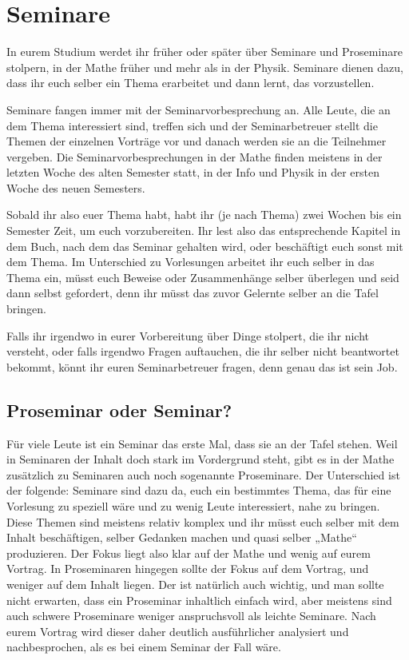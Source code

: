 \section{Seminare}

In eurem Studium werdet ihr früher oder später über Seminare und Proseminare stolpern, in der Mathe früher und mehr als in der Physik. Seminare dienen dazu, dass ihr euch selber ein Thema erarbeitet und dann lernt, das vorzustellen.

Seminare fangen immer mit der Seminarvorbesprechung an. Alle Leute, die an dem Thema interessiert sind, treffen sich und der Seminarbetreuer stellt die Themen der einzelnen Vorträge vor und danach werden sie an die Teilnehmer vergeben. Die Seminarvorbesprechungen in der Mathe finden meistens in der letzten Woche des alten Semester statt, in der Info und Physik in der ersten Woche des neuen Semesters.

Sobald ihr also euer Thema habt, habt ihr (je nach Thema) zwei Wochen bis ein Semester Zeit, um euch vorzubereiten. Ihr lest also das entsprechende Kapitel in dem Buch, nach dem das Seminar gehalten wird, oder beschäftigt euch sonst mit dem Thema. Im Unterschied zu Vorlesungen arbeitet ihr euch selber in das Thema ein, müsst euch Beweise oder Zusammenhänge selber überlegen und seid dann selbst gefordert, denn ihr müsst das zuvor Gelernte selber an die Tafel bringen.

Falls ihr irgendwo in eurer Vorbereitung über Dinge stolpert, die ihr nicht versteht, oder falls irgendwo Fragen auftauchen, die ihr selber nicht beantwortet bekommt, könnt ihr euren Seminarbetreuer fragen, denn genau das ist sein Job.

\subsection{Proseminar oder Seminar?}
Für viele Leute ist ein Seminar das erste Mal, dass sie an der Tafel stehen. Weil in Seminaren der Inhalt doch stark im Vordergrund steht, gibt es in der Mathe zusätzlich zu Seminaren auch noch sogenannte Proseminare. Der Unterschied ist der folgende: Seminare sind dazu da, euch ein bestimmtes Thema, das für eine Vorlesung zu speziell wäre und zu wenig Leute interessiert, nahe zu bringen. Diese Themen sind meistens relativ komplex und ihr müsst euch selber mit dem Inhalt beschäftigen, selber Gedanken machen und quasi selber „Mathe“ produzieren. Der Fokus liegt also klar auf der Mathe und wenig auf eurem Vortrag. In Proseminaren hingegen sollte der Fokus auf dem Vortrag, und weniger auf dem Inhalt liegen. Der ist natürlich auch wichtig, und man sollte nicht erwarten, dass ein Proseminar inhaltlich einfach wird, aber meistens sind auch schwere Proseminare weniger anspruchsvoll als leichte Seminare. Nach eurem Vortrag wird dieser daher deutlich ausführlicher analysiert und nachbesprochen, als es bei einem Seminar der Fall wäre.

